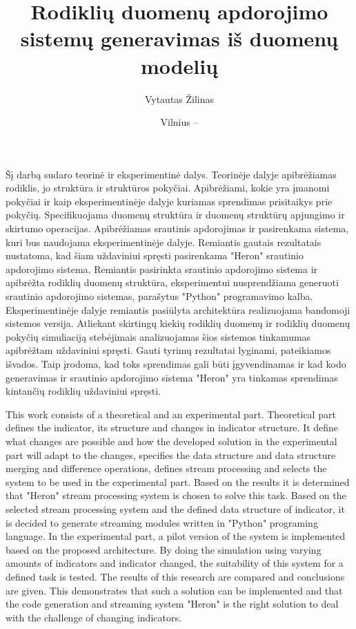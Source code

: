 \documentclass{VUMIFPSbakalaurinis}
\title{Rodiklių duomenų apdorojimo sistemų generavimas iš duomenų modelių}
\author{Vytautas Žilinas}
\date{Vilnius – \the\year}
\begin{document}
 
\maketitle

\cleardoublepage{}
\setcounter{page}{2}

Šį darbą sudaro teorinė ir eksperimentinė dalys. Teorinėje dalyje apibrėžiamas rodiklis, jo struktūra ir struktūros pokyčiai. Apibrėžiami, kokie yra įmanomi pokyčiai ir kaip eksperimentinėje dalyje kuriamas sprendimas prisitaikys prie pokyčių. Specifikuojama duomenų struktūra ir duomenų struktūrų apjungimo ir skirtumo operacijas. Apibrėžiamas srautinis apdorojimas ir pasirenkama sistema, kuri bus naudojama eksperimentinėje dalyje. Remiantis gautais rezultatais
nustatoma, kad šiam uždaviniui spręsti pasirenkama "Heron" srautinio apdorojimo sistema. Remiantis pasirinkta srautinio apdorojimo sistema ir apibrėžta rodiklių duomenų struktūra, eksperimentui nusprendžiama generuoti srautinio apdorojimo sistemas, parašytus "Python" programavimo kalba. Eksperimentinėje dalyje remiantis pasiūlyta architektūra realizuojama bandomoji sistemos versija. Atliekant skirtingų kiekių rodiklių duomenų ir rodiklių duomenų pokyčių simuliaciją stebėjimais analizuojamas šios sistemos tinkamumas apibrėžtam uždaviniui spręsti. Gauti tyrimų rezultatai lyginami, pateikiamos išvados. Taip įrodoma, kad toks sprendimas gali būti įgyvendinamas ir kad kodo generavimas ir srautinio apdorojimo sistema "Heron" yra tinkamas sprendimas kintančių rodiklių uždaviniui spręsti.

This work consists of a theoretical and an experimental part. Theoretical part defines the indicator, its structure and changes in indicator structure. It define what changes are possible and how the developed solution in the experimental part will adapt to the changes, specifies the data structure and data structure merging and difference operations, defines stream processing and selects the system to be used in the experimental part. Based on the results it is determined that "Heron" stream processing system is chosen to solve this task. Based on the selected stream processing system and the defined data structure of indicator, it is decided to generate streaming modules written in "Python" programing language. In the experimental part, a pilot version of the system is implemented based on the proposed architecture. By doing the simulation using varying amounts of indicators and indicator changed, the suitability of this system for a defined task is tested. The results of this research are compared and conclusions are given. This demonstrates that such a solution can be implemented and that the code generation and streaming system "Heron" is the right solution to deal with the challenge of changing indicators.
\end{document}
